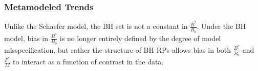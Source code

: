 %
\subsubsection{Metamodeled Trends}


%
Unlike the Schaefer model, the BH set is not a constant in 
$\frac{B^*}{B_0}$. Under the BH model, bias in $\frac{B^*}{B_0}$ is no 
longer entirely defined by the degree of model misspecification, but rather the 
structure of BH RPs allows bias in both $\frac{B^*}{B_0}$ and $\frac{F^*}{M}$ 
to interact as a function of contrast in the data.

%
%


